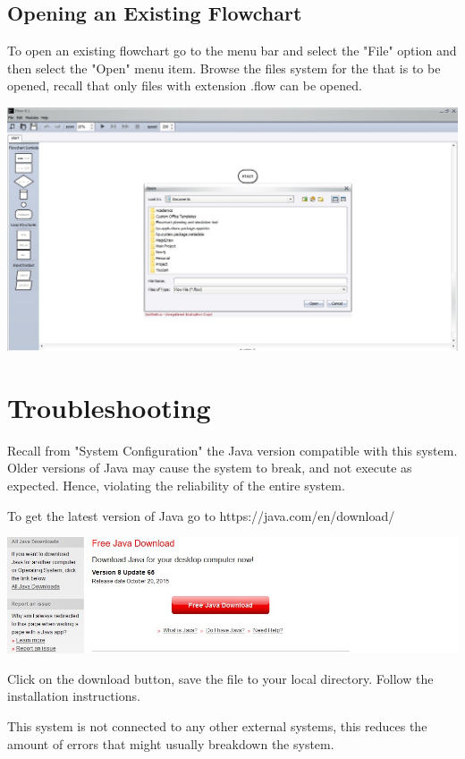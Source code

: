 \documentclass[11pt,a4paper,titlepage]{article}
\begin{document}
	\subsection{Opening an Existing Flowchart}
	
	To open an existing flowchart go to the menu bar and select the "File" option and then select the "Open" menu item. Browse the files system for the that is to be opened, recall that only files with extension .flow can be opened. \newline
	
	\includegraphics[width=14cm]{images/openFlowchart.jpg}
	
\section{Troubleshooting}

Recall from "System Configuration" the Java version compatible with this system. Older versions of Java may cause the system to break, and not execute as expected. Hence, violating the reliability of the entire system. \newline

To get the latest version of Java go to https://java.com/en/download/ \newline \newline

\includegraphics[width=14cm]{images/installJava.jpg} \newline

Click on the download button, save the file to your local directory. Follow the installation instructions.

This system is not connected to any other external systems, this reduces the amount of errors that might usually breakdown the system.
\end{document}
